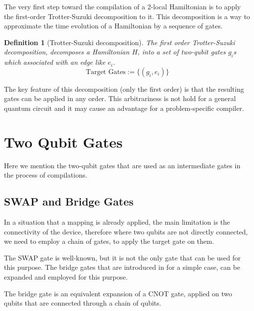 \documentclass{article}
\newtheorem{defn}{Definition}
\begin{document}
  The very first step toward the compilation of a 2-local Hamiltonian is to apply the first-order Trotter-Suzuki decomposition \cite{?} to it. This decomposition is a way to approximate the time evolution of a Hamiltonian by a sequence of gates. 

  \begin{defn}[Trotter-Suzuki decomposition]
    The first order Trotter-Suzuki decomposition, decomposes a Hamiltonian $H$, into a set of two-qubit gates $g_i$s which associated with an edge like $e_i$.
    \begin{equation}
      \text{Target Gates} := \{ (g_i, e_i) \}
    \end{equation}
  \end{defn}

  The key feature of this decomposition (only the first order) is that the resulting gates can be applied in any order. This arbitrariness is not hold for a general quantum circuit and it may cause an advantage for a problem-specific compiler. %
  

  \section{Two Qubit Gates}
  Here we mention the two-qubit gates that are used as an intermediate gates in the process of compilations.
  
  \subsection{SWAP and Bridge Gates}
  In a situation that a mapping is already applied, the main limitation is the connectivity of the device, therefore where two qubits are not directly connected, we need to employ a chain of gates, to apply the target gate on them.

  The SWAP gate is well-known, but it is not the only gate that can be used for this purpose. The bridge gates that are introduced in \cite{?} for a simple case, can be expanded and employed for this purpose. 

  The bridge gate is an equivalent expansion of a CNOT gate, applied on two qubits that are connected through a chain of qubits.
  
\end{document}
